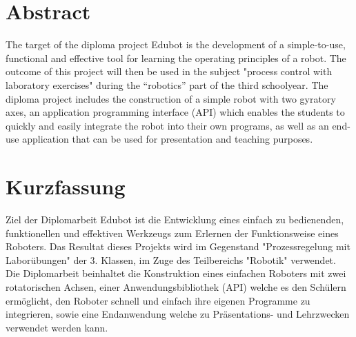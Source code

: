 
{}

\section*{Abstract}
The target of the diploma project Edubot is the development of a simple-to-use, functional and effective tool for learning the operating principles of a robot. The outcome of this project will then be used in the subject "process control with laboratory exercises" during the “robotics” part of the third schoolyear. The diploma project includes the construction of a simple robot with two gyratory axes, an application programming interface (API) which enables the students to quickly and easily integrate the robot into their own programs, as well as an end-use application that can be used for presentation and teaching purposes. 

\section*{Kurzfassung}
Ziel der Diplomarbeit Edubot ist die Entwicklung eines einfach zu bedienenden, funktionellen und effektiven Werkzeugs zum Erlernen der Funktionsweise eines Roboters. Das Resultat dieses Projekts wird im Gegenstand "Prozessregelung mit Laborübungen" der 3. Klassen, im Zuge des Teilbereichs "Robotik" verwendet. Die Diplomarbeit beinhaltet die Konstruktion eines einfachen Roboters mit zwei rotatorischen Achsen, einer Anwendungsbibliothek (API) welche es den Schülern ermöglicht, den Roboter schnell und einfach ihre eigenen Programme zu integrieren, sowie eine Endanwendung welche zu Präsentations- und Lehrzwecken verwendet werden kann.


%
%